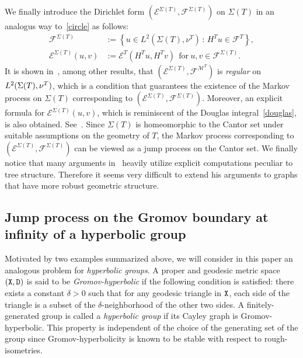 \documentclass[AHL,Unicode,longabstracts,published]{cedram}
\newcommand{\ce}{\mathcal{E}}
\newcommand{\cf}{\mathcal{F}}
\newcommand{\cm}{\mathcal{M}}
\begin{document}
We finally introduce the Dirichlet form $(\ce^{\Sigma(T)},
\cf^{\Sigma(T)})$ on $\Sigma(T)$ in an analogus way to~\eqref{circle} as follows:
\begin{equation}\label{tree}
\begin{split}
\cf^{\Sigma(T)}&:=\left\{u\in L^2\left(\Sigma(T),\nu^T\right)\,:\, H^Tu\in \cf^T\right\},\\
\ce^{\Sigma(T)}(u,v)&:=\ce^{T}\left(H^{T}u,H^{T}v\right)\ \ \text{for}\ u,v\in\cf^{\Sigma(T)}.
\end{split}
\end{equation}
It is shown in~\cite{Ki}, among other results, that $(\ce^{\Sigma(T)}, \cf^{\cm^T})$ is \emph{regular} on $L^2(\Sigma(T),\linebreak \nu^{T})$, which is a condition that guarantees the existence of the Markov process on $\Sigma(T)$ corresponding to $(\ce^{\Sigma(T)}, \cf^{\Sigma(T)})$. Moreover, an explicit formula for $\ce^{\Sigma(T)}(u,v)$, which is reminiscent of the Douglas integral~\eqref{douglas}, is also obtained. See~\cite[Theorem~5.6]{Ki}. Since $\Sigma(T)$ is homeomorphic to the Cantor set under suitable assumptions on the geometry of $T$, the Markov process corresponding to $(\ce^{\Sigma(T)}, \cf^{\Sigma(T)})$ can be viewed as a jump process on the Cantor set. We finally notice that many arguments in~\cite{Ki} heavily utilize explicit computations peculiar to tree structure. Therefore it seems very difficult to extend his arguments to graphs that have more robust geometric structure.



\subsection*{Jump process on the Gromov boundary at infinity of a hyperbolic group}
Motivated by two examples summarized above, we will consider in this paper an analogous problem for \emph{hyperbolic groups}. A proper and geodesic metric space $(\tt{X}, \tt{D})$ is said to be \emph{Gromov-hyperbolic} if the following condition is satisfied: there exists a constant $\delta>0$ such that for any geodesic triangle in ${\tt X}$, each side of the triangle is a subset of the $\delta$-neighborhood of the other two sides. A finitely-generated group is called a \emph{hyperbolic group} if its Cayley graph is Gromov-hyperbolic. This property is independent of the choice of the generating set of the group since Gromov-hyperbolicity is known to be stable with respect to rough-isometries.
\end{document}
